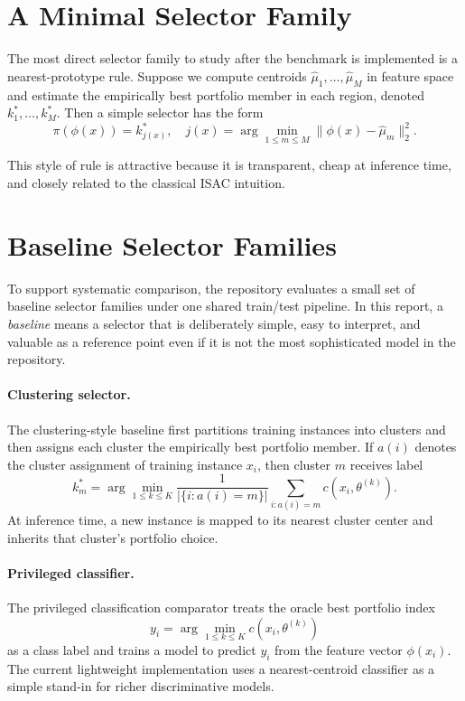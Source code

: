 \documentclass[11pt]{report}
\begin{document}
\section{A Minimal Selector Family}

The most direct selector family to study after the benchmark is implemented is a nearest-prototype rule. Suppose we compute centroids $\hat{\mu}_1, \dots, \hat{\mu}_M$ in feature space and estimate the empirically best portfolio member in each region, denoted $k_1^*, \dots, k_M^*$. Then a simple selector has the form
\[
\pi(\phi(x)) = k_{j(x)}^*,
\quad
j(x) = \arg\min_{1 \le m \le M} \lVert \phi(x) - \hat{\mu}_m \rVert_2^2.
\]

This style of rule is attractive because it is transparent, cheap at inference time, and closely related to the classical ISAC intuition.

\section{Baseline Selector Families}

To support systematic comparison, the repository evaluates a small set of baseline selector families under one shared train/test pipeline. In this report, a \emph{baseline} means a selector that is deliberately simple, easy to interpret, and valuable as a reference point even if it is not the most sophisticated model in the repository.

\paragraph{Clustering selector.}
The clustering-style baseline first partitions training instances into clusters and then assigns each cluster the empirically best portfolio member. If $a(i)$ denotes the cluster assignment of training instance $x_i$, then cluster $m$ receives label
\[
k_m^* = \arg\min_{1 \le k \le K}
\frac{1}{|\{i : a(i)=m\}|}
\sum_{i : a(i)=m} c(x_i, \theta^{(k)}).
\]
At inference time, a new instance is mapped to its nearest cluster center and inherits that cluster's portfolio choice.

\paragraph{Privileged classifier.}
The privileged classification comparator treats the oracle best portfolio index
\[
y_i = \arg\min_{1 \le k \le K} c(x_i, \theta^{(k)})
\]
as a class label and trains a model to predict $y_i$ from the feature vector $\phi(x_i)$. The current lightweight implementation uses a nearest-centroid classifier as a simple stand-in for richer discriminative models.
\end{document}
